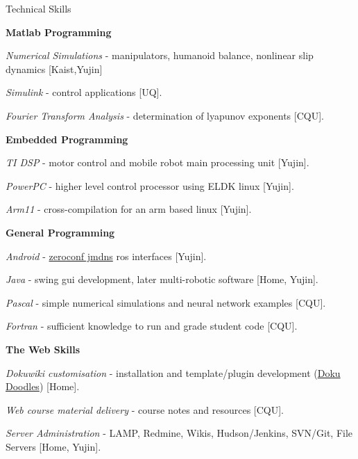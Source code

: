 \documentclass[a4paper,10pt]{article}
\begin{document}
\begin{cvsection}{Technical Skills}
\begin{djs_itemize}
\begin{djs_itemize}
    \end{djs_itemize}
    \item \textbf{Matlab Programming}
    \begin{djs_itemize}
      \item \textit{Numerical Simulations} - manipulators, humanoid balance, nonlinear slip dynamics [Kaist,Yujin]
      \item \textit{Simulink} - control applications [UQ].
      \item \textit{Fourier Transform Analysis} - determination of lyapunov exponents [CQU].
    \end{djs_itemize}
    \item \textbf{Embedded Programming}
    \begin{djs_itemize}
      \item \textit{TI DSP} - motor control and mobile robot main processing unit [Yujin].
      \item \textit{PowerPC} - higher level control processor using ELDK linux [Yujin].
      \item \textit{Arm11} - cross-compilation for an arm based linux [Yujin].
    \end{djs_itemize}
    \item \textbf{General Programming}
    \begin{djs_itemize}
      \item \textit{Android} - \href{https://github.com/ros-java}{zeroconf jmdns} ros interfaces [Yujin].
      \item \textit{Java} - swing gui development, later multi-robotic software [Home, Yujin].
      \item \textit{Pascal} - simple numerical simulations and neural network examples [CQU].
      \item \textit{Fortran} - sufficient knowledge to run and grade student code [CQU].
    \end{djs_itemize}
    \item \textbf{The Web Skills}
    \begin{djs_itemize}
      \item \textit{Dokuwiki customisation} - installation and template/plugin development (\href{http://snorriheim.dnsdojo.com/doku}{Doku Doodles}) [Home].
      \item \textit{Web course material delivery} - course notes and resources [CQU].
      \item \textit{Server Administration} - LAMP, Redmine, Wikis, Hudson/Jenkins, SVN/Git, File Servers [Home, Yujin].

\end{djs_itemize}
\end{djs_itemize}
\end{cvsection}
\end{document}
